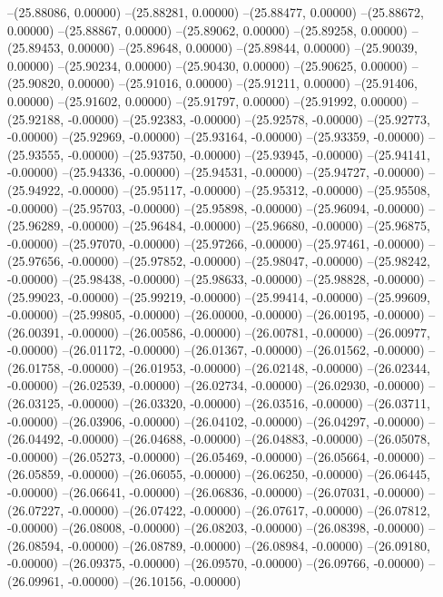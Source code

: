 --(25.88086, 0.00000)
--(25.88281, 0.00000)
--(25.88477, 0.00000)
--(25.88672, 0.00000)
--(25.88867, 0.00000)
--(25.89062, 0.00000)
--(25.89258, 0.00000)
--(25.89453, 0.00000)
--(25.89648, 0.00000)
--(25.89844, 0.00000)
--(25.90039, 0.00000)
--(25.90234, 0.00000)
--(25.90430, 0.00000)
--(25.90625, 0.00000)
--(25.90820, 0.00000)
--(25.91016, 0.00000)
--(25.91211, 0.00000)
--(25.91406, 0.00000)
--(25.91602, 0.00000)
--(25.91797, 0.00000)
--(25.91992, 0.00000)
--(25.92188, -0.00000)
--(25.92383, -0.00000)
--(25.92578, -0.00000)
--(25.92773, -0.00000)
--(25.92969, -0.00000)
--(25.93164, -0.00000)
--(25.93359, -0.00000)
--(25.93555, -0.00000)
--(25.93750, -0.00000)
--(25.93945, -0.00000)
--(25.94141, -0.00000)
--(25.94336, -0.00000)
--(25.94531, -0.00000)
--(25.94727, -0.00000)
--(25.94922, -0.00000)
--(25.95117, -0.00000)
--(25.95312, -0.00000)
--(25.95508, -0.00000)
--(25.95703, -0.00000)
--(25.95898, -0.00000)
--(25.96094, -0.00000)
--(25.96289, -0.00000)
--(25.96484, -0.00000)
--(25.96680, -0.00000)
--(25.96875, -0.00000)
--(25.97070, -0.00000)
--(25.97266, -0.00000)
--(25.97461, -0.00000)
--(25.97656, -0.00000)
--(25.97852, -0.00000)
--(25.98047, -0.00000)
--(25.98242, -0.00000)
--(25.98438, -0.00000)
--(25.98633, -0.00000)
--(25.98828, -0.00000)
--(25.99023, -0.00000)
--(25.99219, -0.00000)
--(25.99414, -0.00000)
--(25.99609, -0.00000)
--(25.99805, -0.00000)
--(26.00000, -0.00000)
--(26.00195, -0.00000)
--(26.00391, -0.00000)
--(26.00586, -0.00000)
--(26.00781, -0.00000)
--(26.00977, -0.00000)
--(26.01172, -0.00000)
--(26.01367, -0.00000)
--(26.01562, -0.00000)
--(26.01758, -0.00000)
--(26.01953, -0.00000)
--(26.02148, -0.00000)
--(26.02344, -0.00000)
--(26.02539, -0.00000)
--(26.02734, -0.00000)
--(26.02930, -0.00000)
--(26.03125, -0.00000)
--(26.03320, -0.00000)
--(26.03516, -0.00000)
--(26.03711, -0.00000)
--(26.03906, -0.00000)
--(26.04102, -0.00000)
--(26.04297, -0.00000)
--(26.04492, -0.00000)
--(26.04688, -0.00000)
--(26.04883, -0.00000)
--(26.05078, -0.00000)
--(26.05273, -0.00000)
--(26.05469, -0.00000)
--(26.05664, -0.00000)
--(26.05859, -0.00000)
--(26.06055, -0.00000)
--(26.06250, -0.00000)
--(26.06445, -0.00000)
--(26.06641, -0.00000)
--(26.06836, -0.00000)
--(26.07031, -0.00000)
--(26.07227, -0.00000)
--(26.07422, -0.00000)
--(26.07617, -0.00000)
--(26.07812, -0.00000)
--(26.08008, -0.00000)
--(26.08203, -0.00000)
--(26.08398, -0.00000)
--(26.08594, -0.00000)
--(26.08789, -0.00000)
--(26.08984, -0.00000)
--(26.09180, -0.00000)
--(26.09375, -0.00000)
--(26.09570, -0.00000)
--(26.09766, -0.00000)
--(26.09961, -0.00000)
--(26.10156, -0.00000)
